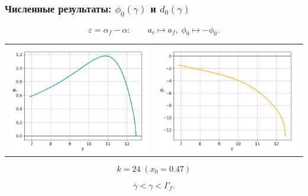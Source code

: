 \documentclass[fullscreen=true, unicode, bookmarks=false]{beamer}
\begin{document}
\begin{frame}
\frametitle{ Численные результаты: $ \phi_0(\gamma) $ и $ d_0(\gamma) $ }

$$ \varepsilon = \alpha_f - \alpha: \qquad a_c \longmapsto a_f, \; \phi_0 \longmapsto -\phi_0. $$

\vfill

\begin{center}
\begin{tabular}{cc}
\includegraphics[scale=0.32]{oscillating_phi0_after_tangent_047.png} &
\includegraphics[scale=0.32]{oscillating_d0_after_tangent_047.png} \\
\end{tabular}
\end{center}
$$ k=24 \; (x_0=0.47) $$

\vfill

$$ \overline{\gamma} < \gamma < \Gamma_f. $$

\end{frame}
\end{document}
